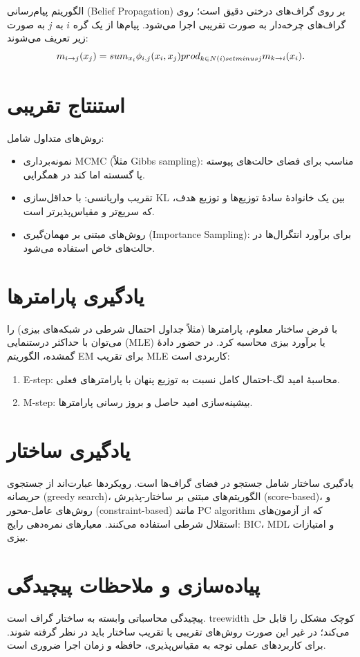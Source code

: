 الگوریتم پیام‌رسانی (Belief Propagation) بر روی گراف‌های درختی دقیق است؛ روی گراف‌های چرخه‌دار به صورت تقریبی اجرا می‌شود. پیام‌ها از یک گره $i$ به $j$ به صورت زیر تعریف می‌شوند:
$$
m_{i\to j}(x_j)=\\sum_{x_i} \phi_{i,j}(x_i,x_j)\\prod_{k\in N(i)\\setminus j} m_{k\to i}(x_i).
$$

\section{استنتاج تقریبی}
روش‌های متداول شامل:
\begin{itemize}
    \item نمونه‌برداری MCMC (مثلاً Gibbs sampling): مناسب برای فضای حالت‌های پیوسته یا گسسته اما کند در همگرایی.
    \item تقریب واریانسی: با حداقل‌سازی KL بین یک خانوادهٔ سادهٔ توزیع‌ها و توزیع هدف، که سریع‌تر و مقیاس‌پذیرتر است.
    \item روش‌های مبتنی بر مهمان‌گیری (Importance Sampling): برای برآورد انتگرال‌ها در حالت‌های خاص استفاده می‌شود.
\end{itemize}

\section{یادگیری پارامترها}
با فرض ساختار معلوم، پارامترها (مثلاً جداول احتمال شرطی در شبکه‌های بیزی) را می‌توان با حداکثر درستنمایی (MLE) یا برآورد بیزی محاسبه کرد. در حضور دادهٔ گمشده، الگوریتم EM برای تقریب MLE کاربردی است:
\begin{enumerate}
    \item E-step: محاسبهٔ امید لگ-احتمال کامل نسبت به توزیع پنهان با پارامترهای فعلی.
    \item M-step: بیشینه‌سازی امید حاصل و بروز رسانی پارامترها.
\end{enumerate}

\section{یادگیری ساختار}
یادگیری ساختار شامل جستجو در فضای گراف‌ها است. رویکردها عبارت‌اند از جستجوی حریصانه (greedy search)، الگوریتم‌های مبتنی بر ساختار-پذیرش (score-based)، و روش‌های عامل-محور (constraint-based) مانند PC algorithm که از آزمون‌های استقلال شرطی استفاده می‌کنند. معیارهای نمره‌دهی رایج: BIC، MDL و امتیازات بیزی.

\section{پیاده‌سازی و ملاحظات پیچیدگی}
پیچیدگی محاسباتی وابسته به ساختار گراف است. treewidth کوچک مشکل را قابل حل می‌کند؛ در غیر این صورت روش‌های تقریبی یا تقریب ساختار باید در نظر گرفته شوند. برای کاربردهای عملی توجه به مقیاس‌پذیری، حافظه و زمان اجرا ضروری است.

